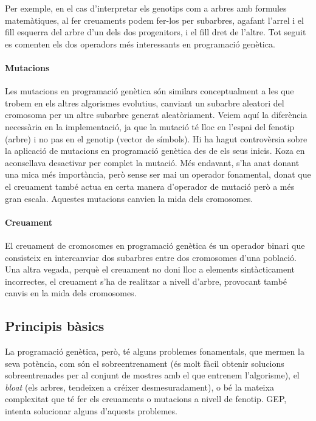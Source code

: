 Per exemple, en el cas d'interpretar els genotips com a arbres amb formules
matemàtiques, al fer creuaments podem fer-los per subarbres, agafant l'arrel i
el fill esquerra del arbre d'un dels dos progenitors, i el fill dret de l'altre.
Tot seguit es comenten els dos operadors més interessants en programació
genètica.

\paragraph{Mutacions} %
\label{par:Mutacions}
Les mutacions en programació genètica són similars conceptualment a les que
trobem en els altres algorismes evolutius, canviant un subarbre aleatori del
cromosoma per un altre subarbre generat aleatòriament.  Veiem aquí la diferència
necessària en la implementació, ja que la mutació té lloc en l'espai del fenotip
(arbre) i no pas en el genotip (vector de símbols).  Hi ha hagut controvèrsia
sobre la aplicació de mutacions en programació genètica des de els seus inicis.
Koza en \cite{koza:92} aconsellava desactivar per complet la mutació.   Més
endavant, s'ha anat donant una mica més importància, però sense ser mai un
operador fonamental, donat que el creuament també actua en certa manera
d'operador de mutació però a més gran escala.  Aquestes mutacions canvien la
mida dels cromosomes.

\paragraph{Creuament} %
\label{par:Creuament}
El creuament de cromosomes en programació genètica és un operador binari que
consisteix en intercanviar dos subarbres entre dos cromosomes d'una població.
Una altra vegada, perquè el creuament no doni lloc a elements sintàcticament
incorrectes, el creuament s'ha de realitzar a nivell d'arbre, provocant també
canvis en la mida dels cromosomes.



\subsection{Principis bàsics} %
\label{sub:Principis Basics}

La programació genètica, però, té alguns problemes fonamentals, que mermen la 
seva potència, com són el sobreentrenament (és molt fàcil obtenir 
solucions sobreentrenades per al conjunt de mostres amb el que entrenem
 l'algorisme), el \emph{bloat} (els arbres, tendeixen a créixer desmesuradament),
o bé la mateixa complexitat que té fer els creuaments o mutacions a nivell de 
fenotip. GEP, intenta solucionar alguns d'aquests problemes.


